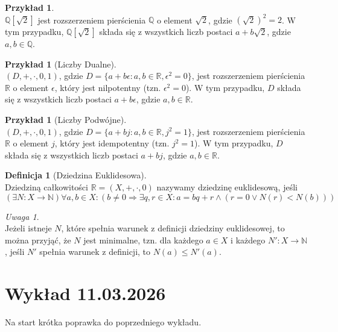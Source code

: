 \documentclass[11pt,a4paper]{article}
\theoremstyle{definition}
\newtheorem{definicja}[twierdzenie]{Definicja}
\newtheorem{przyklad}[twierdzenie]{Przykład}
\theoremstyle{remark}
\newtheorem{uwaga}[twierdzenie]{Uwaga}
\begin{document}
\begin{przyklad}~\\
    $\mathbb{Q}[\sqrt{2}]$ jest rozszerzeniem pierścienia $\mathbb{Q}$ o element $\sqrt{2}$, gdzie $(\sqrt{2})^2 = 2$. W tym przypadku, $\mathbb{Q}[\sqrt{2}]$ składa się z wszystkich liczb postaci $a + b\sqrt{2}$, gdzie $a, b \in \mathbb{Q}$.
\end{przyklad}
\begin{przyklad}[Liczby Dualne]~\\
    $(D, +, \cdot, 0, 1)$, gdzie $D = \{ a + b\epsilon : a, b \in \mathbb{R}, \epsilon^2 = 0 \}$, jest rozszerzeniem pierścienia $\mathbb{R}$ o element $\epsilon$, który jest nilpotentny (tzn. $\epsilon^2 = 0$). W tym przypadku, $D$ składa się z wszystkich liczb postaci $a + b\epsilon$, gdzie $a, b \in \mathbb{R}$.
\end{przyklad}
\begin{przyklad}[Liczby Podwójne]~\\
$(D, +, \cdot, 0, 1)$, gdzie $D = \{ a + bj : a, b \in \mathbb{R}, j^2 = 1 \}$, jest rozszerzeniem pierścienia $\mathbb{R}$ o element $j$, który jest idempotentny (tzn. $j^2 = 1$). W tym przypadku, $D$ składa się z wszystkich liczb postaci $a + bj$, gdzie $a, b \in \mathbb{R}$.
\end{przyklad}
\begin{definicja}[Dziedzina Euklidesowa]~\\
    Dziedziną całkowitości $\mathbb{R} = (X, +, \cdot, 0)$ nazywamy dziedzinę euklidesową, jeśli
    \[
        (\exists N: X \rightarrow \mathbb{N}) \forall a, b \in X: (b \neq 0 \Rightarrow \exists q, r \in X: a = bq + r \land (r = 0 \lor N(r) < N(b)))
    \]
\end{definicja}
\begin{uwaga}~\\
    Jeżeli istneje $N$, które spełnia warunek z definicji dziedziny euklidesowej, to można przyjąć, że $N$ jest minimalne, tzn. dla każdego $a \in X$ i każdego $N': X \rightarrow \mathbb{N}$, jeśli $N'$ spełnia warunek z definicji, to $N(a) \leq N'(a)$.
\end{uwaga}

\section{Wykład 11.03.2026}
Na start krótka poprawka do poprzedniego wykładu.
\end{document}
